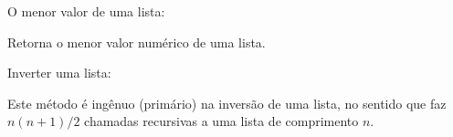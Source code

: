 \documentclass[sans]{beamer}
\begin{document}
\begin{frame}
\begin{block}{O menor valor de uma lista:}

Retorna o menor valor numérico de uma lista.





\end{block}
\end{frame}


\begin{frame}
\begin{block}{Inverter uma lista:}

Este método é ingênuo (primário) na inversão de uma lista, 
 no sentido que faz  $n(n+1)/2$ chamadas recursivas a uma lista de comprimento $n$.





\end{block}
\end{frame}

\end{document}

